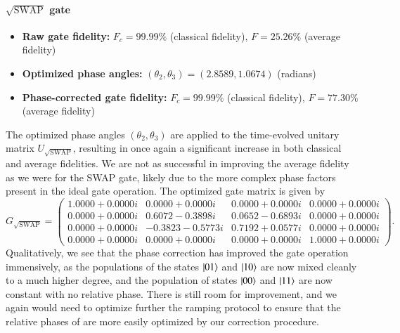 \documentclass{subfiles}
\begin{document}
\paragraph{$\sqrt{\text{SWAP}}$ gate}
\begin{itemize}
    \item \textbf{Raw gate fidelity:} $F_c = 99.99\%$ (classical fidelity), $F = 25.26\%$ (average fidelity)
    \item \textbf{Optimized phase angles:} $(\theta_2, \theta_3) = (2.8589, 1.0674)$ (radians)
    \item \textbf{Phase-corrected gate fidelity:} $F_c = 99.99\%$ (classical fidelity), $F = 77.30\%$ (average fidelity)
\end{itemize}
The optimized phase angles $(\theta_2, \theta_3)$ are applied to the time-evolved unitary matrix $U_{\sqrt{\text{SWAP}}}$, resulting in once again a significant increase in both classical and average fidelities. We are not as successful in improving the average fidelity as we were for the SWAP gate, likely due to the more complex phase factors present in the ideal gate operation.
The optimized gate matrix is given by
\begin{equation}
G_{\sqrt{\mathrm{SWAP}}}
=
\begin{pmatrix}
 1.0000 + 0.0000i & 0.0000 + 0.0000i & 0.0000 + 0.0000i & 0.0000 + 0.0000i\\
 0.0000 + 0.0000i & 0.6072 - 0.3898i & 0.0652 - 0.6893i & 0.0000 + 0.0000i\\
 0.0000 + 0.0000i & -0.3823 - 0.5773i & 0.7192 + 0.0577i & 0.0000 + 0.0000i\\
 0.0000 + 0.0000i & 0.0000 + 0.0000i & 0.0000 + 0.0000i & 1.0000 + 0.0000i
\end{pmatrix}.
\end{equation}
Qualitatively, we see that the phase correction has improved the gate operation immensively, as the populations of the states $\ket{01}$ and $\ket{10}$ are now mixed cleanly to a much higher degree, and the population of states $\ket{00}$ and $\ket{11}$ are now constant with no relative phase. There is still room for improvement, and we again would need to optimize further the ramping protocol to ensure that the relative phases of are more easily optimized by our correction procedure.
\end{document}
